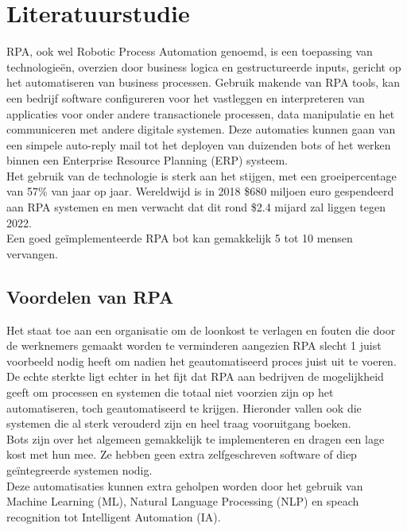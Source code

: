 \section{Literatuurstudie}
\label{sec:literatuurstudie}
RPA, ook wel Robotic Process Automation genoemd, is een toepassing van technologieën, overzien door  business logica en gestructureerde inputs, gericht op het automatiseren van business processen. Gebruik makende van RPA tools, kan een bedrijf software configureren voor het vastleggen en interpreteren van applicaties voor onder andere transactionele processen, data manipulatie en het communiceren met andere digitale systemen. Deze automaties kunnen gaan van een simpele auto-reply mail tot het deployen van duizenden bots of het werken binnen een Enterprise Resource Planning (ERP) systeem. \autocite{whatIsRPA} \\
Het gebruik van de technologie is sterk aan het stijgen, met een groeipercentage van 57\% van jaar op jaar. Wereldwijd is in 2018 \$680 miljoen euro gespendeerd aan RPA systemen en men verwacht dat dit rond \$2.4 mijard zal liggen tegen 2022. \autocite{isRPAWorthIt}\\
Een goed geïmplementeerde RPA bot kan gemakkelijk 5 tot 10 mensen vervangen. \autocite{rpaMomentum}

\subsection{Voordelen van RPA}
Het staat toe aan een organisatie om de loonkost te verlagen en fouten die door de werknemers gemaakt worden te verminderen aangezien RPA slecht 1 juist voorbeeld nodig heeft om nadien het geautomatiseerd proces juist uit te voeren.\\
De echte sterkte ligt echter in het fijt dat RPA aan bedrijven de mogelijkheid geeft om processen en systemen die totaal niet voorzien zijn op het automatiseren, toch geautomatiseerd te krijgen. Hieronder vallen ook die systemen die al sterk verouderd zijn en heel traag vooruitgang boeken. \\
Bots zijn over het algemeen gemakkelijk te implementeren en dragen een lage kost met hun mee. Ze hebben geen extra zelfgeschreven software of diep geïntegreerde systemen nodig.\\
Deze automatisaties kunnen extra geholpen worden door het gebruik van Machine Learning  (ML),  Natural Language Processing (NLP) en speach recognition tot  Intelligent Automation (IA). \autocite{whatIsRPA}


